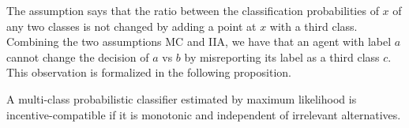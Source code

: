 \documentclass{article}
\begin{document}
The assumption says that the ratio between the classification probabilities of $x $ of any two classes is not changed by adding a point at $x $ with a third class.
\newline \newline
Combining the two assumptions MC and IIA, we have that an agent with label $a $ cannot change the decision of $a $ vs $b $ by misreporting its label as a third class $c $. This observation is formalized in the following proposition.
\newline \newline
\begin{thm} \label{thm:margin} 
A multi-class probabilistic classifier estimated by maximum likelihood is incentive-compatible if it is monotonic and independent of irrelevant alternatives.
\end{thm}
\end{document}
